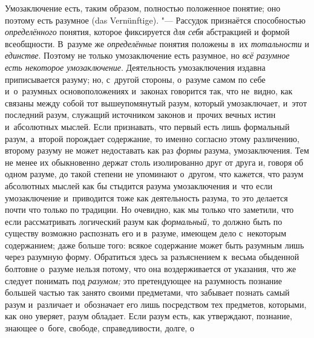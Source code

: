 Умозаключение есть, таким образом, полностью положенное понятие; оно поэтому
есть разумное (das Vernünftige). "--- Рассудок признаётся способностью
{\em определённого} понятия, которое фиксируется {\em для себя} абстракцией
и формой всеобщности. В~разуме же {\em определённые} понятия положены в~их
{\em тотальности} и {\em единстве}. Поэтому не только умозаключение есть
разумное, но {\em всё разумное есть некоторое умозаключение}. Деятельность
умозаключения издавна приписывается разуму; но, с~другой стороны, о~разуме
самом по себе и~о~разумных основоположениях и~законах говорится так, что
не~видно, как связаны между собой тот вышеупомянутый разум, который
умозаключает, и~этот последний разум, служащий источником законов и~прочих
вечных истин и~абсолютных мыслей. Если признавать, что первый есть лишь
формальный разум, а~второй порождает содержание, то именно согласно этому
различению, второму разуму не может недоставать как раз {\em формы} разума,
умозаключения. Тем не менее их обыкновенно держат столь изолированно друг
от друга и, говоря об одном разуме, до такой степени не упоминают
о~другом, что кажется, что разум абсолютных мыслей как бы
стыдится разума умозаключения и~что если умозаключение и~приводится тоже
как деятельность разума, то это делается почти что только по традиции. Но
очевидно, как мы только что заметили, что если рассматривать логический разум
как {\em формальный,} то должно быть по существу возможно распознать его и
в~разуме, имеющем дело с~некоторым содержанием; даже больше того: всякое
содержание может быть разумным лишь через разумную форму. Обратиться здесь
за разъяснением к~весьма обыденной болтовне о~разуме нельзя потому, что она
воздерживается от указания, что же следует понимать под {\em разумом;} это
претендующее на разумность познание
большей частью так занято своими предметами, что забывает
познать самый разум и~различает и~обозначает его лишь посредством тех
предметов, которыми, как оно уверяет, разум обладает. Если разум есть, как
утверждают, познание, знающее о~боге, свободе, справедливости, долге, о
